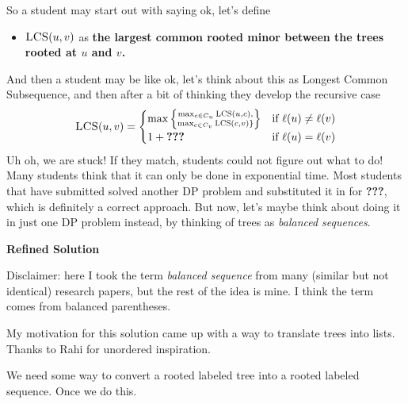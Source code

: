 \documentclass{article}
\begin{document}
            So a student may start out with saying ok, let's define 
            \begin{itemize}
                \item $\textsc{LCS}(u, v)$ as \textbf{the largest common rooted minor between the trees rooted at $u$ and $v$.}
            \end{itemize}
            And then a student may be like ok, let's think about this as Longest Common Subsequence, and then after a bit of thinking they develop the recursive case
            $$\textsc{LCS}(u, v) = 
            \begin{cases}
                \max\left\{\substack{\max_{c \in C_{u}}\textsc{LCS}(u, c),\\ \max_{c \in C_{v}}\textsc{LCS}(c, v)\}}\right\} & \text{if $\ell(u) \ne \ell(v)$} \\
                1 + \textbf{???} & \text{if $\ell(u) = \ell(v)$}
            \end{cases}$$
            Uh oh, we are stuck! If they match, students could not figure out what to do! Many students think that it can only be done in exponential time. Most students that have submitted solved another DP problem and substituted it in for \textbf{???}, which is definitely a correct approach. But now, let's maybe think about doing it in just one DP problem instead, by thinking of trees as \textit{balanced sequences}.

        \textbf{Refined Solution}

        \begin{tcolorbox}
            Disclaimer: here I took the term \textit{balanced sequence} from many (similar but not identical) research papers, but the rest of the idea is mine. I think the term comes from balanced parentheses.

            \vspace{2mm}
            My motivation for this solution came up with a way to translate trees into lists. Thanks to Rahi for unordered inspiration.
        \end{tcolorbox}

        We need some way to convert a rooted labeled tree into a rooted labeled sequence. Once we do this.
        
\end{document}

